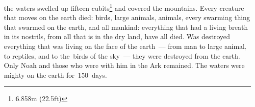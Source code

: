 \begin{inparaenum}
     the waters swelled up fifteen cubits\footnote{6.858\thinspace m (22.5\thinspace ft)} and covered the mountains.%
     Every creature that moves on the earth died: birds, large animals, animals, every swarming thing that swarmed on the earth, and all mankind:%
     everything that had a living breath in its nostrils, from all that is in the dry land, have all died.%
     Was destroyed everything that was living on the face of the earth~--- from man to large animal, to reptiles, and to the\understood\ birds of the sky~--- they were destroyed from the earth. Only Noah and those who were with him in the Ark remained.%
     The waters were mighty on the earth for\understood\ 150~days.%
\end{inparaenum}
